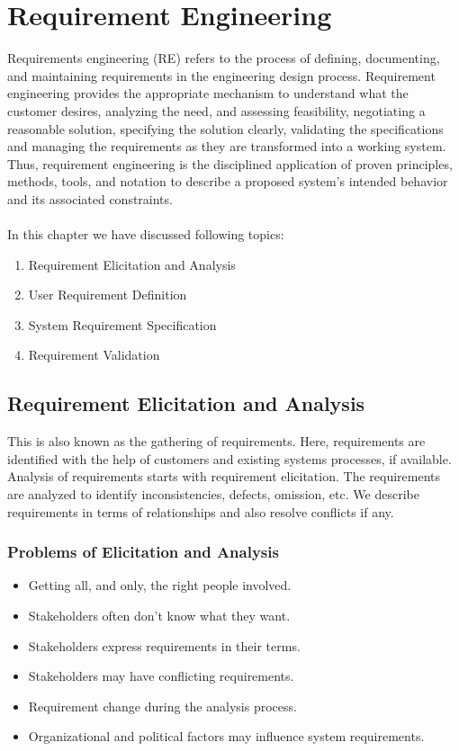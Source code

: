 \chapter{Requirement Engineering}
Requirements engineering (RE) refers to the process of defining, documenting, and maintaining requirements in the engineering design process. Requirement engineering provides the appropriate mechanism to understand what the customer desires, analyzing the need, and assessing feasibility, negotiating a reasonable solution, specifying the solution clearly, validating the specifications and managing the requirements as they are transformed into a working system. Thus, requirement engineering is the disciplined application of proven principles, methods, tools, and notation to describe a proposed system's intended behavior and its associated constraints.
\\ \\
In this chapter we have discussed following topics:

\begin{enumerate}
 \item Requirement Elicitation and Analysis
 \item User Requirement Definition
 \item System Requirement Specification
 \item Requirement Validation
\end{enumerate}
\clearpage

\section{Requirement Elicitation and Analysis}
This is also known as the gathering of requirements. Here, requirements are identified with the help of customers and existing systems processes, if available.
\\
Analysis of requirements starts with requirement elicitation. The requirements are analyzed to identify inconsistencies, defects, omission, etc. We describe requirements in terms of relationships and also resolve conflicts if any.

\subsection{Problems of Elicitation and Analysis}

\begin{itemize}
 \item Getting all, and only, the right people involved.
 \item Stakeholders often don't know what they want.
 \item Stakeholders express requirements in their terms.
 \item Stakeholders may have conflicting requirements.
 \item Requirement change during the analysis process.
 \item Organizational and political factors may influence system requirements.
\end{itemize}

